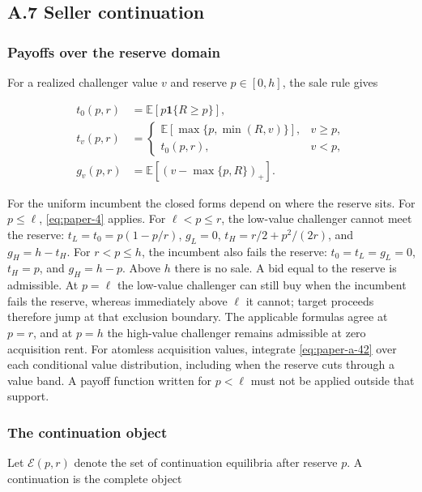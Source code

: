 \documentclass[
  12pt,
]{article}
\begin{document}
\subsection{A.7 Seller continuation}\label{pa-design}

\subsubsection{Payoffs over the reserve
domain}\label{payoffs-over-the-reserve-domain}

For a realized challenger value \(v\) and reserve \(p\in[0,h]\), the
sale rule gives

\[
\begin{aligned}
t_0(p,r)&=\mathbb E[p\mathbf1\{R\ge p\}],\\
t_v(p,r)&=
\begin{cases}
\mathbb E[\max\{p,\min(R,v)\}],&v\ge p,\\
t_0(p,r),&v<p,
\end{cases}\\
g_v(p,r)&=\mathbb E[(v-\max\{p,R\})_+].
\end{aligned}
\tag{A.42}\label{eq:paper-a-42}
\]

For the uniform incumbent the closed forms depend on where the reserve
sits. For \(p\le\ell\), \eqref{eq:paper-4} applies. For \(\ell<p\le r\),
the low-value challenger cannot meet the reserve: \(t_L=t_0=p(1-p/r)\),
\(g_L=0\), \(t_H=r/2+p^2/(2r)\), and \(g_H=h-t_H\). For \(r<p\le h\),
the incumbent also fails the reserve: \(t_0=t_L=g_L=0\), \(t_H=p\), and
\(g_H=h-p\). Above \(h\) there is no sale. A bid equal to the reserve is
admissible. At \(p=\ell\) the low-value challenger can still buy when
the incumbent fails the reserve, whereas immediately above \(\ell\) it
cannot; target proceeds therefore jump at that exclusion boundary. The
applicable formulas agree at \(p=r\), and at \(p=h\) the high-value
challenger remains admissible at zero acquisition rent. For atomless
acquisition values, integrate \eqref{eq:paper-a-42} over each
conditional value distribution, including when the reserve cuts through
a value band. A payoff function written for \(p<\ell\) must not be
applied outside that support.

\subsubsection{The continuation object}\label{the-continuation-object}

Let \(\mathcal E(p,r)\) denote the set of continuation equilibria after
reserve \(p\). A continuation is the complete object
\end{document}
